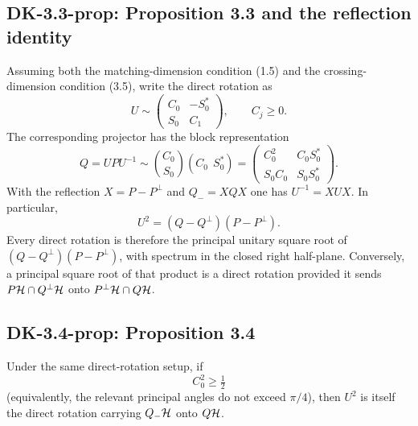 \subsection*{DK-3.3-prop: Proposition 3.3 and the reflection identity}
Assuming both the matching-dimension condition (1.5) and the crossing-dimension condition (3.5), write the direct rotation as
\begin{equation}
 U\sim\begin{pmatrix}C_0&-S_0^*\\S_0&C_1\end{pmatrix},
 \qquad C_j\ge0.
 \tag{3.6}
\end{equation}
The corresponding projector has the block representation
\begin{equation}
 Q=UPU^{-1}
 \sim
 \binom{C_0}{S_0}(C_0\ \ S_0^*)
 =\begin{pmatrix}
 C_0^2&C_0S_0^*\\
 S_0C_0&S_0S_0^*
 \end{pmatrix}.
 \tag{3.7}
\end{equation}
With the reflection $X=P-P^\perp$ and $Q_-=XQX$ one has $U^{-1}=XUX$.  In particular,
\begin{equation}
 U^2=(Q-Q^\perp)(P-P^\perp).
 \tag{3.8}
\end{equation}
Every direct rotation is therefore the principal unitary square root of $(Q-Q^\perp)(P-P^\perp)$, with spectrum in the closed right half-plane.  Conversely, a principal square root of that product is a direct rotation provided it sends $P\mathcal{H}\cap Q^\perp\mathcal{H}$ onto $P^\perp\mathcal{H}\cap Q\mathcal{H}$.

\subsection*{DK-3.4-prop: Proposition 3.4}
Under the same direct-rotation setup, if
\[
 C_0^2\ge\tfrac12
\]
(equivalently, the relevant principal angles do not exceed $\pi/4$), then $U^2$ is itself the direct rotation carrying $Q_-\mathcal{H}$ onto $Q\mathcal{H}$.

